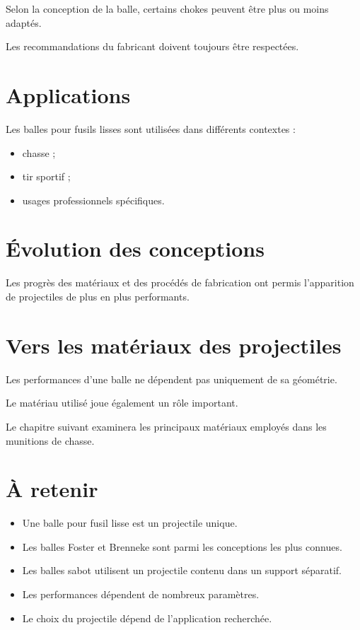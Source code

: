 Selon la conception de la balle, certains chokes peuvent être plus ou moins
adaptés.

Les recommandations du fabricant doivent toujours être respectées.

\section{Applications}

Les balles pour fusils lisses sont utilisées dans différents contextes :

\begin{itemize}
    \item chasse ;
    \item tir sportif ;
    \item usages professionnels spécifiques.
\end{itemize}

\section{Évolution des conceptions}

Les progrès des matériaux et des procédés de fabrication ont permis
l'apparition de projectiles de plus en plus performants.

\section{Vers les matériaux des projectiles}

Les performances d'une balle ne dépendent pas uniquement de sa géométrie.

Le matériau utilisé joue également un rôle important.

Le chapitre suivant examinera les principaux matériaux employés dans les
munitions de chasse.

\section{À retenir}

\begin{aretenir}

\begin{itemize}
    \item Une balle pour fusil lisse est un projectile unique.
    \item Les balles Foster et Brenneke sont parmi les conceptions les plus
          connues.
    \item Les balles sabot utilisent un projectile contenu dans un support
          séparatif.
    \item Les performances dépendent de nombreux paramètres.
    \item Le choix du projectile dépend de l'application recherchée.
\end{itemize}

\end{aretenir}

